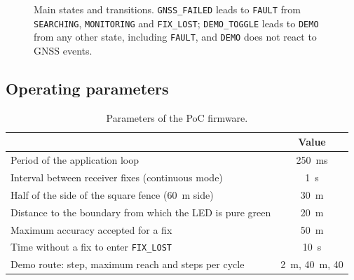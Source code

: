 \begin{figure}[H]
\centering
{}
\caption{Main states and transitions. \texttt{GNSS\_FAILED} leads to \texttt{FAULT} from
\texttt{SEARCHING}, \texttt{MONITORING} and \texttt{FIX\_LOST}; \texttt{DEMO\_TOGGLE} leads to
\texttt{DEMO} from any other state, including \texttt{FAULT}, and \texttt{DEMO} does not react to
GNSS events.}
\end{figure}

\subsection{Operating parameters}

\begin{table}[H]
\centering
\small
\begin{tabularx}{\textwidth}{|X c|}
\hline
\tablehead{\textbf{Parameter} & \textbf{Value}} \\ \hline
Period of the application loop & 250~ms \\ \hline
Interval between receiver fixes (continuous mode) & 1~s \\ \hline
Half of the side of the square fence (60~m side) & 30~m \\ \hline
Distance to the boundary from which the LED is pure green & 20~m \\ \hline
Maximum accuracy accepted for a fix & 50~m \\ \hline
Time without a fix to enter \texttt{FIX\_LOST} & 10~s \\ \hline
Demo route: step, maximum reach and steps per cycle & 2~m, 40~m, 40 \\ \hline
\end{tabularx}
\caption{Parameters of the PoC firmware.}
\end{table}

